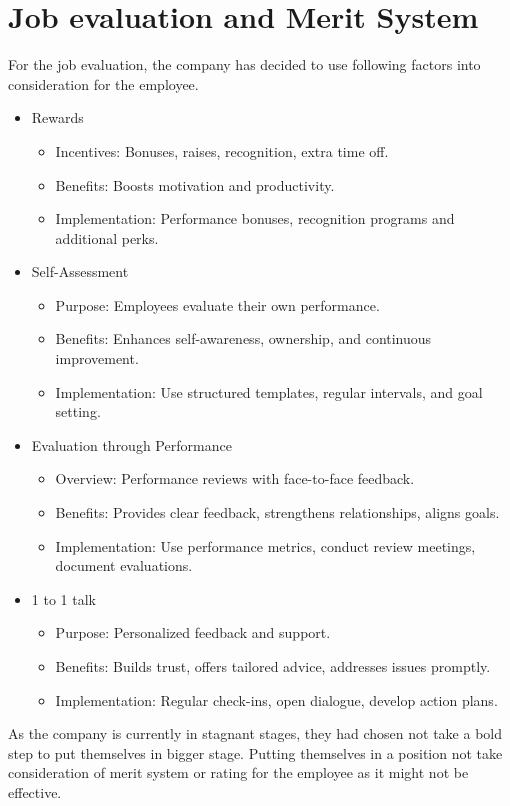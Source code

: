 \section{Job evaluation and Merit System}
For the job evaluation, the company has decided to use following factors into consideration for the employee.
\begin{itemize}
    \item Rewards
    \begin{itemize}
    \item Incentives: Bonuses, raises, recognition, extra time off.
    \item Benefits: Boosts motivation and productivity.
    \item Implementation: Performance bonuses, recognition programs and additional perks.
\end{itemize}
    \item Self-Assessment
    \begin{itemize}
    \item Purpose: Employees evaluate their own performance.
    \item Benefits: Enhances self-awareness, ownership, and continuous improvement.
    \item Implementation: Use structured templates, regular intervals, and goal setting.
\end{itemize}
    \item Evaluation through Performance
    \begin{itemize}
    \item Overview: Performance reviews with face-to-face feedback.
    \item Benefits: Provides clear feedback, strengthens relationships, aligns goals.
    \item Implementation: Use performance metrics, conduct review meetings, document evaluations.
\end{itemize}
    \item 1 to 1 talk
    \begin{itemize}
    \item Purpose: Personalized feedback and support.
    \item Benefits: Builds trust, offers tailored advice, addresses issues promptly.
    \item Implementation: Regular check-ins, open dialogue, develop action plans.
\end{itemize}
\end{itemize}
As the company is currently in stagnant stages, they had chosen not take a bold step to put themselves in bigger stage. Putting themselves in a position not take consideration of merit system or rating for the employee as it might not be effective.
